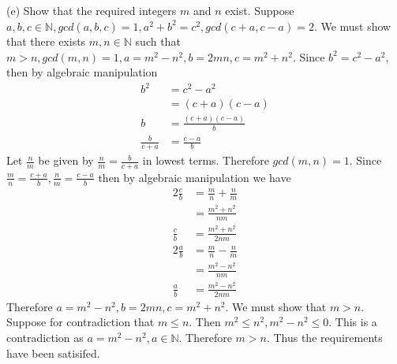 \documentclass[12pt, letterpaper]{article}
\newcommand{\N}{\mathbb{N}}
\begin{document}
(e) Show that the required integers $m$ and $n$ exist.
Suppose $a,b,c \in \N, gcd(a,b,c) = 1, a^2 + b^2 = c^2, gcd(c+a,c-a) = 2$. We must show that there exists $m,n \in \N$ such that $m>n, gcd(m,n) = 1, a = m^2 - n^2, b=2mn,c=m^2+n^2$.  
Since $b^2 = c^2 - a^2,$ then by algebraic manipulation 
\begin{align*}
	b^2 &= c^2 - a^2\\
	&= (c+a)(c-a)\\
	b &= \frac{(c+a)(c-a)}{b}\\
	\frac{b}{c+a} &= \frac{c-a}{b}
\end{align*}
Let $\frac{n}{m}$ be given by $\frac{n}{m} = \frac{b}{c+a}$ in lowest terms.  Therefore $gcd(m,n) = 1.$  Since $\frac{m}{n} = \frac{c+a}{b}, \frac{n}{m} = \frac{c-a}{b}$ then by algebraic manipulation we have 
\begin{align*}
	2\frac{c}{b} &= \frac{m}{n} + \frac{n}{m}\\
	&= \frac{m^2 + n^2}{nm}\\
	\frac{c}{b} &= \frac{m^2 + n^2}{2nm}\\
	2\frac{a}{b} &= \frac{m}{n} - \frac{n}{m}\\
	&= \frac{m^2-n^2}{nm}\\
	\frac{a}{b} &= \frac{m^2-n^2}{2nm}
\end{align*}
	Therefore $a=m^2 - n^2, b = 2mn, c=m^2 + n^2.$  We must show that $m > n.$  Suppose for contradiction that $m \leq n.$  Then $m^2 \leq n^2, m^2 - n^2 \leq 0.$  This is a contradiction as $a = m^2 - n^2, a \in \N.$  Therefore $m>n$.  Thus the requirements have been satisifed.       
\end{document}
